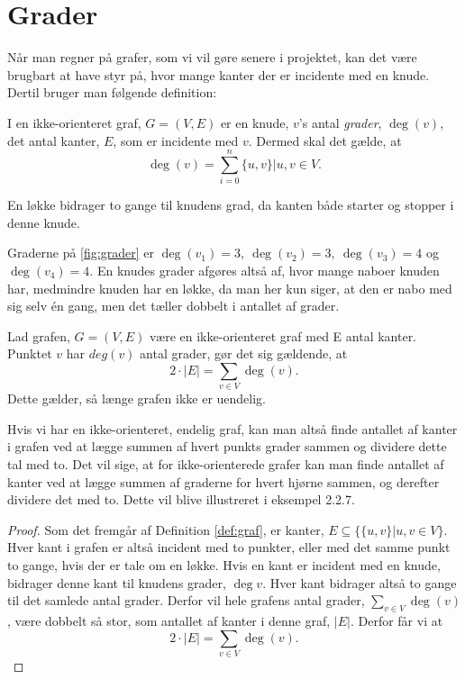 \section{Grader} \label{sec:grader}
Når man regner på grafer, som vi vil gøre senere i projektet, kan det være brugbart at have styr på, hvor mange kanter der er incidente med en knude. Dertil bruger man følgende definition:

\begin{defn}[Grader] \label{defn:grader}
I en ikke-orienteret graf, $G = (V,E)$ er en knude, $v$'s antal \emph{grader}, $\deg(v)$, det antal kanter, $E$, som er incidente med $v$. Dermed skal det gælde, at
\begin{equation}
\deg(v)=\sum_{i=0} ^{n} \{u,v\}|u,v \in V .
\end{equation}
\end{defn}

En løkke bidrager to gange til knudens grad, da kanten både starter og stopper i denne knude.

\begin{exmp} \label{ex:grader}

Graderne på \autoref{fig:grader} er $\deg(v_{1})=3, \ \deg(v_{2})=3, \ \deg(v_{3})=4$ og $\deg(v_{4})=4$. En knudes grader afgøres altså af, hvor mange naboer knuden har, medmindre knuden har en løkke, da man her kun siger, at den er nabo med sig selv én gang, men det tæller dobbelt i antallet af grader.


\end{exmp}

\begin{thm}
Lad grafen, $G = (V,E)$ være en ikke-orienteret graf med E antal kanter. Punktet $v$ har $deg(v)$ antal grader, gør det sig gældende, at
\begin{equation}
2 \cdot |E|= \sum_{v \in V} { } \deg(v).
\end{equation}
Dette gælder, så længe grafen ikke er uendelig.
\end{thm}
Hvis vi har en ikke-orienteret, endelig graf, kan man altså finde antallet af kanter i grafen ved at lægge summen af hvert punkts grader sammen og dividere dette tal med to.
Det vil sige, at for ikke-orienterede grafer kan man finde antallet af kanter ved at lægge summen af graderne for hvert hjørne sammen, og derefter dividere det med to. Dette vil blive illustreret i eksempel 2.2.7.

\begin{proof}
Som det fremgår af Definition \ref{def:graf}, er kanter, $E \subseteq \{\{u,v\}|u,v \in V \}$. Hver kant i grafen er altså incident med to punkter, eller med det samme punkt to gange, hvis der er tale om en løkke. Hvis en kant er incident med en knude, bidrager denne kant til knudens grader, $\deg{v}$. Hver kant bidrager altså to gange til det samlede antal grader. Derfor vil hele grafens antal grader, $\sum_{v \in V} { } \deg(v)$, være dobbelt så stor, som antallet af kanter i denne graf, $|E|$. Derfor får vi at 
\begin{equation}
2 \cdot |E|= \sum_{v \in V} { } \deg(v).
\end{equation} 
\end{proof}
